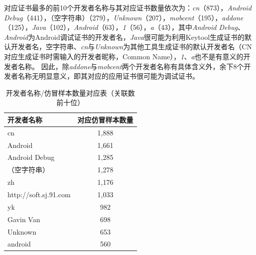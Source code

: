 对应证书最多的前10个开发者名称与其对应证书数量依次为：\emph{cn}（873），\emph{Android Debug}（441），（空字符串）（279），\emph{Unknown}（207），\emph{mobcent}（195），\emph{addone}（125），\emph{Java}（102），\emph{Android}（63），\emph{1}（56），\emph{a}（43），其中\emph{Android Debug}、\emph{Android}为Android调试证书的开发者名，\emph{Java}很可能为利用Keytool生成证书的默认开发者名，空字符串、\emph{cn}与\emph{Unknown}为其他工具生成证书的默认开发者名（CN对应生成证书时需输入的开发者昵称，Common Name），\emph{1}、\emph{a}也不是有意义的开发者名称。
因此，除\emph{addone}与\emph{mobcent}两个开发者名称有具体含义外，余下8个开发者名称无明显意义，即其对应的应用证书很可能为调试证书。

\begin{table}[htbp]
    \renewcommand{\arraystretch}{1}
    \footnotesize
    \centering
    \caption{开发者名称/仿冒样本数量对应表（关联数前十位）}
    \vspace{1mm}
    \begin{tabular}{l c}
        \toprule
        {\bf 开发者名称}                        & {\bf 对应仿冒样本数量} \\
        \midrule
        cn                                      & 1,888                  \\
        \rowcolor{gray!15}Android               & 1,661                  \\
        Android Debug                           & 1,285                  \\
        \rowcolor{gray!15}（空字符串）          & 1,278                  \\
        zh                                      & 1,176                  \\
        \rowcolor{gray!15}http://soft.sj.91.com & 1,033                  \\
        yk                                      & 982                    \\
        \rowcolor{gray!15}Gavin Van             & 698                    \\
        Unknown                                 & 653                    \\
        \rowcolor{gray!15}android               & 560                    \\
        \bottomrule
    \end{tabular}
    \label{table:developer_name_sample_cnt}
\end{table}

